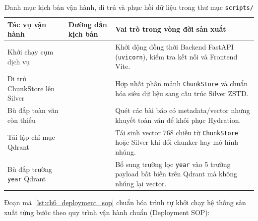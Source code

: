 \begin{table}[htbp]
  \centering
  \footnotesize
  \caption[Danh mục công cụ vận hành và phục hồi dữ liệu trong thư mục scripts/]{Danh mục kịch bản vận hành, di trú và phục hồi dữ liệu trong thư mục \texttt{scripts/}}
  \label{tab:ch6_ops_scripts}
  \vspace{4pt}
  \setlength{\tabcolsep}{3pt}
  \begin{tabularx}{\linewidth}{|>{\raggedright\arraybackslash}p{36mm}|>{\raggedright\arraybackslash}p{44mm}|L|}
    \hline
    \textbf{Tác vụ vận hành} & \textbf{Đường dẫn kịch bản} & \textbf{Vai trò trong vòng đời sản xuất} \\
    \hline
    Khởi chạy cụm dịch vụ &  & Khởi động đồng thời Backend FastAPI (\texttt{uvicorn}), kiểm tra kết nối và Frontend Vite. \\
    \hline
    Di trú ChunkStore lên Silver &  & Hợp nhất phân mảnh \texttt{ChunkStore} và chuẩn hóa siêu dữ liệu sang cấu trúc Silver ZSTD. \\
    \hline
    Bù đắp toàn văn còn thiếu &  & Quét các bài báo có metadata/vector nhưng khuyết toàn văn để khôi phục Hydration. \\
    \hline
    Tái lập chỉ mục Qdrant &  & Tái sinh vector 768 chiều từ \texttt{ChunkStore} hoặc Silver khi đổi chunker hay mô hình nhúng. \\
    \hline
    Bù đắp trường \texttt{year} Qdrant &  & Bổ sung trường lọc \texttt{year} vào 5 trường payload bất biến trên Qdrant mà không nhúng lại vector. \\
    \hline
  \end{tabularx}
\end{table}

Đoạn mã~\ref{lst:ch6_deployment_sop} chuẩn hóa trình tự khởi chạy hệ thống sản xuất từng bước theo quy trình vận hành chuẩn (Deployment SOP):

